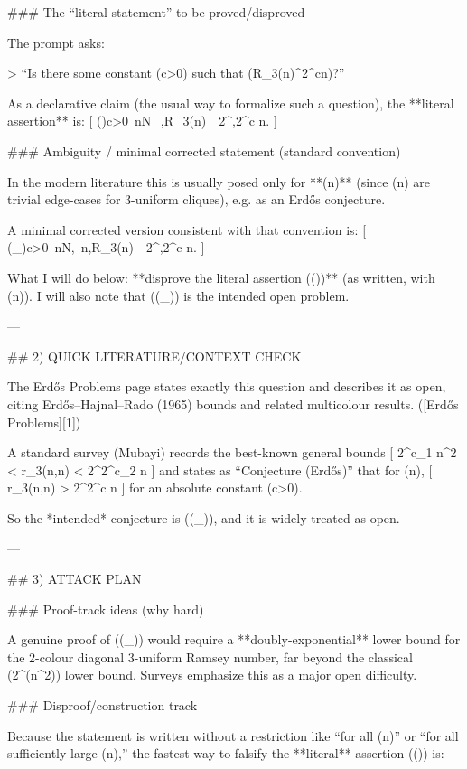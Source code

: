 ### The “literal statement” to be proved/disproved

The prompt asks:

> “Is there some constant (c>0) such that (R_3(n)^{2^{cn}})?”

As a declarative claim (the usual way to formalize such a question), the **literal assertion** is:
[
(\star)\qquad \exists c>0\ \forall n\in\mathbb N_{},\quad R_3(n)\ \ge\ 2^{,2^{c n}}.
]

### Ambiguity / minimal corrected statement (standard convention)

In the modern literature this is usually posed only for **(n)** (since (n) are trivial edge-cases for 3-uniform cliques), e.g. as an Erdős conjecture. 

A minimal corrected version consistent with that convention is:
[
(\star_{})\qquad \exists c>0\ \forall n\in\mathbb N,\ n,\quad R_3(n)\ \ge\ 2^{,2^{c n}}.
]

What I will do below: **disprove the literal assertion ((\star))** (as written, with (n)). I will also note that ((\star_{})) is the intended open problem.

---

## 2) QUICK LITERATURE/CONTEXT CHECK

The Erdős Problems page states exactly this question and describes it as open, citing Erdős–Hajnal–Rado (1965) bounds and related multicolour results. ([Erdős Problems][1])

A standard survey (Mubayi) records the best-known general bounds
[
2^{c_1 n^2} < r_3(n,n) < 2^{2^{c_2 n}}
]
and states as “Conjecture (Erdős)” that for (n),
[
r_3(n,n) > 2^{2^{c n}}
]
for an absolute constant (c>0). 

So the *intended* conjecture is ((\star_{})), and it is widely treated as open. 

---

## 3) ATTACK PLAN

### Proof-track ideas (why hard)

A genuine proof of ((\star_{})) would require a **doubly-exponential** lower bound for the 2-colour diagonal 3-uniform Ramsey number, far beyond the classical (2^{\Theta(n^2)}) lower bound. Surveys emphasize this as a major open difficulty. 

### Disproof/construction track

Because the statement is written without a restriction like “for all (n)” or “for all sufficiently large (n),” the fastest way to falsify the **literal** assertion ((\star)) is:

